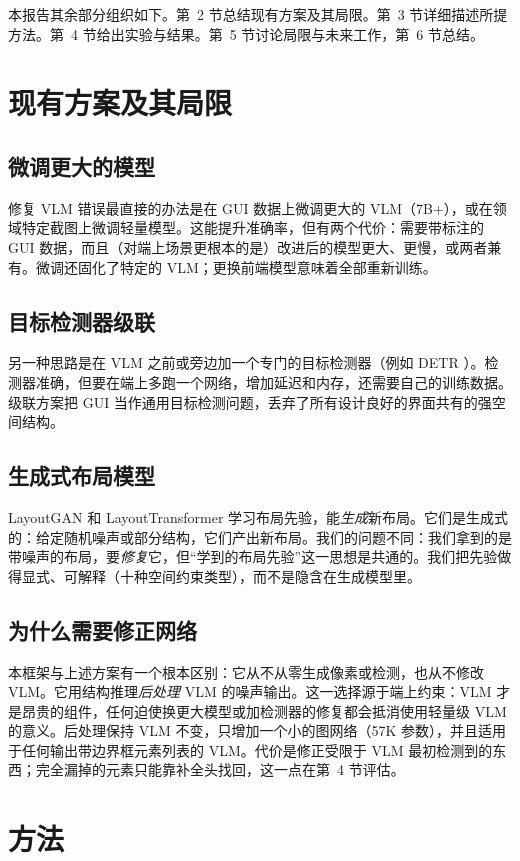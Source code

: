 \documentclass[11pt, letterpaper]{ctexart}
\begin{document}
本报告其余部分组织如下。第~2 节总结现有方案及其局限。第~3 节详细描述所提方法。第~4 节给出实验与结果。第~5 节讨论局限与未来工作，第~6 节总结。

\section{现有方案及其局限}
\subsection{微调更大的模型}
修复 VLM 错误最直接的办法是在 GUI 数据上微调更大的 VLM（7B+），或在领域特定截图上微调轻量模型。这能提升准确率，但有两个代价：需要带标注的 GUI 数据，而且（对端上场景更根本的是）改进后的模型更大、更慢，或两者兼有。微调还固化了特定的 VLM；更换前端模型意味着全部重新训练。

\subsection{目标检测器级联}
另一种思路是在 VLM 之前或旁边加一个专门的目标检测器（例如 DETR \cite{carion2020detr}）。检测器准确，但要在端上多跑一个网络，增加延迟和内存，还需要自己的训练数据。级联方案把 GUI 当作通用目标检测问题，丢弃了所有设计良好的界面共有的强空间结构。

\subsection{生成式布局模型}
LayoutGAN \cite{li2019layoutgan} 和 LayoutTransformer \cite{gupta2021layouttransformer} 学习布局先验，能\emph{生成}新布局。它们是生成式的：给定随机噪声或部分结构，它们产出新布局。我们的问题不同：我们拿到的是带噪声的布局，要\emph{修复}它，但“学到的布局先验”这一思想是共通的。我们把先验做得显式、可解释（十种空间约束类型），而不是隐含在生成模型里。

\subsection{为什么需要修正网络}
本框架与上述方案有一个根本区别：它从不从零生成像素或检测，也从不修改 VLM。它用结构推理\emph{后处理} VLM 的噪声输出。这一选择源于端上约束：VLM 才是昂贵的组件，任何迫使换更大模型或加检测器的修复都会抵消使用轻量级 VLM 的意义。后处理保持 VLM 不变，只增加一个小的图网络（57K 参数），并且适用于任何输出带边界框元素列表的 VLM。代价是修正受限于 VLM 最初检测到的东西；完全漏掉的元素只能靠补全头找回，这一点在第~4 节评估。

\section{方法}
\end{document}
